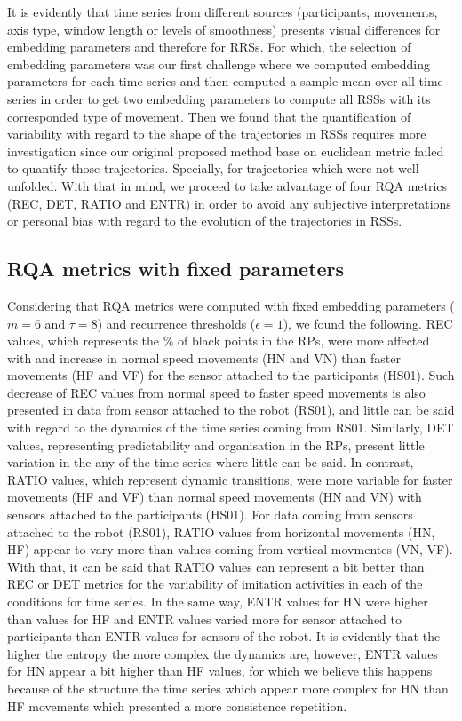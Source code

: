 It is evidently that time series from different sources (participants, movements, axis type, 
window length or levels of smoothness) presents visual differences for 
embedding parameters and therefore for RRSs. For which, the selection of embedding parameters 
was our first challenge where we computed embedding parameters for each time series and 
then computed a sample mean over all time series 
in order to get two embedding parameters to compute all RSSs with its corresponded type of movement.
Then we found that the quantification of variability with regard to the shape 
of the trajectories in RSSs requires more investigation since our original proposed method 
base on euclidean metric failed to quantify those trajectories. Specially, for trajectories 
which were not well unfolded. With that in mind, we proceed to take advantage of 
four RQA metrics (REC, DET, RATIO and ENTR) in order to avoid any subjective interpretations 
or personal bias with regard to the evolution of the trajectories in RSSs.


\subsection{RQA metrics with fixed parameters}
Considering that RQA metrics were computed with fixed embedding parameters 
($m=6$ and $\tau=8$) and recurrence thresholds ($\epsilon=1$), we found the following.
REC values, which represents the \% of black points in the RPs, were more affected with 
and increase in normal speed movements (HN and VN) than faster movements (HF and VF)  
for the sensor attached to the participants (HS01). Such decrease of REC values 
from normal speed to faster speed movements is also presented in data from sensor 
attached to the robot (RS01), and little can be said with regard to the dynamics
of the time series coming from RS01. 
Similarly, DET values, representing predictability and organisation in the RPs, 
present little variation in the any of the time series where little can be said.
In contrast, RATIO values, which represent dynamic transitions, were more 
variable for faster movements (HF and VF) than normal speed movements (HN and VN) 
with sensors attached to the participants (HS01).
For data coming from sensors attached to the robot (RS01), RATIO values
from horizontal movements (HN, HF) appear to vary more than 
values coming from vertical movmentes (VN, VF).
With that, it can be said that RATIO values can represent a bit better
than REC or DET metrics for the variability of imitation activities in each of the conditions
for time series.
In the same way, ENTR values for HN were higher than values for HF
and ENTR values varied more for sensor attached to participants 
than ENTR values for sensors of the robot. It is evidently that 
the higher the entropy the more complex the dynamics are, 
however, ENTR values for HN appear a bit higher than HF values, 
for which we believe this happens because of the structure the time series
which appear more complex for HN than  HF movements which presented a 
more consistence repetition.

